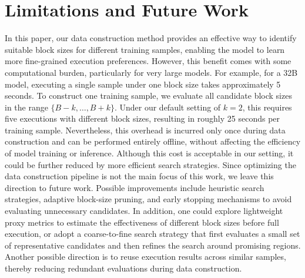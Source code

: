 \documentclass{article}
\begin{document}
\section{Limitations and Future Work}
\label{Limitations}
In this paper, our data construction method provides an effective way to identify suitable block sizes for different training samples, enabling the model to learn more fine-grained execution preferences. However, this benefit comes with some computational burden, particularly for very large models. For example, for a 32B model, executing a single sample under one block size takes approximately 5 seconds. To construct one training sample, we evaluate all candidate block sizes in the range $\{B-k,\dots,B+k\}$. Under our default setting of $k=2$, this requires five executions with different block sizes, resulting in roughly 25 seconds per training sample. Nevertheless, this overhead is incurred only once during data construction and can be performed entirely offline, without affecting the efficiency of model training or inference. Although this cost is acceptable in our setting, it could be further reduced by more efficient search strategies. Since optimizing the data construction pipeline is not the main focus of this work, we leave this direction to future work. Possible improvements include heuristic search strategies, adaptive block-size pruning, and early stopping mechanisms to avoid evaluating unnecessary candidates. In addition, one could explore lightweight proxy metrics to estimate the effectiveness of different block sizes before full execution, or adopt a coarse-to-fine search strategy that first evaluates a small set of representative candidates and then refines the search around promising regions. Another possible direction is to reuse execution results across similar samples, thereby reducing redundant evaluations during data construction.



\newpage

\end{document}

